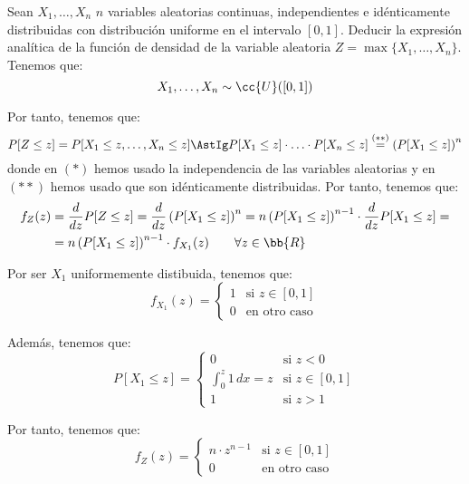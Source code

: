 \documentclass[12pt]{article}
\begin{document}
    \begin{ejercicio}[1.5 puntos]
        Sean $X_1, \dots, X_n$ $n$ variables aleatorias continuas, independientes e idénticamente distribuidas con distribución uniforme en el intervalo $[0,1]$. Deducir la expresión analítica de la función de densidad de la variable aleatoria $Z = \max\{X_1, \dots, X_n\}$.\\

        Tenemos que:
        \begin{equation*}
            X_1, \dots, X_n \sim \cc{U}([0,1])
        \end{equation*}

        Por tanto, tenemos que:
        \begin{equation*}
            P[Z \leq z] = P[X_1 \leq z, \dots, X_n \leq z] \AstIg P[X_1 \leq z] \cdot \ldots \cdot P[X_n \leq z]
            \stackrel{(\ast\ast)}{=}
            \left( P[X_1 \leq z] \right)^n
        \end{equation*}
        donde en $(\ast)$ hemos usado la independencia de las variables aleatorias y en $(\ast\ast)$ hemos usado que son idénticamente distribuidas. Por tanto, tenemos que:
        \begin{align*}
            f_Z(z) &= \dfrac{d}{dz} P[Z \leq z] = \dfrac{d}{dz} \left( P[X_1 \leq z] \right)^n = n \left( P[X_1 \leq z] \right)^{n-1} \cdot \dfrac{d}{dz} P[X_1 \leq z] =\\&= n \left( P[X_1 \leq z] \right)^{n-1} \cdot f_{X_1}(z)\qquad \forall z \in \bb{R}
        \end{align*}

        Por ser $X_1$ uniformemente distibuida, tenemos que:
        \begin{equation*}
            f_{X_1}(z) = \begin{cases}
                1 & \text{si } z \in [0,1]\\
                0 & \text{en otro caso}
            \end{cases}
        \end{equation*}

        Además, tenemos que:
        \begin{equation*}
            P[X_1 \leq z] = \begin{cases}
                0 & \text{si } z < 0\\
                \int_0^z 1 \, dx = z & \text{si } z \in [0,1]\\
                1 & \text{si } z > 1
            \end{cases}
        \end{equation*}

        Por tanto, tenemos que:
        \begin{equation*}
            f_Z(z) = \begin{cases}
                n \cdot z^{n-1} & \text{si } z \in [0,1]\\
                0 & \text{en otro caso}
            \end{cases}
        \end{equation*}
    \end{ejercicio}
\end{document}
